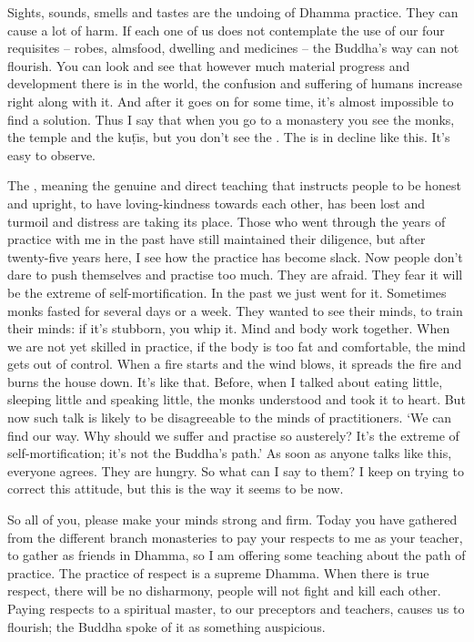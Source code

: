 Sights, sounds, smells and tastes are the undoing of Dhamma practice. They can cause a lot of harm. If each one of us does not contemplate the use of our four requisites -- robes, almsfood, dwelling and medicines -- the Buddha's way can not flourish. You can look and see that however much material progress and development there is in the world, the confusion and suffering of humans increase right along with it. And after it goes on for some time, it's almost impossible to find a solution. Thus I say that when you go to a monastery you see the monks, the temple and the ku\d{t}\={\i}s, but you don't see the . The  is in decline like this. It's easy to observe. 

The , meaning the genuine and direct teaching that instructs people to be honest and upright, to have loving-kindness towards each other, has been lost and turmoil and distress are taking its place. Those who went through the years of practice with me in the past have still maintained their diligence, but after twenty-five years here, I see how the practice has become slack. Now people don't dare to push themselves and practise too much. They are afraid. They fear it will be the extreme of self-mortification. In the past we just went for it. Sometimes monks fasted for several days or a week. They wanted to see their minds, to train their minds: if it's stubborn, you whip it. Mind and body work together. When we are not yet skilled in practice, if the body is too fat and comfortable, the mind gets out of control. When a fire starts and the wind blows, it spreads the fire and burns the house down. It's like that. Before, when I talked about eating little, sleeping little and speaking little, the monks understood and took it to heart. But now such talk is likely to be disagreeable to the minds of practitioners. `We can find our way. Why should we suffer and practise so austerely? It's the extreme of self-mortification; it's not the Buddha's path.' As soon as anyone talks like this, everyone agrees. They are hungry. So what can I say to them? I keep on trying to correct this attitude, but this is the way it seems to be now. 

So all of you, please make your minds strong and firm. Today you have gathered from the different branch monasteries to pay your respects to me as your teacher, to gather as friends in Dhamma, so I am offering some teaching about the path of practice. The practice of respect is a supreme Dhamma. When there is true respect, there will be no disharmony, people will not fight and kill each other. Paying respects to a spiritual master, to our preceptors and teachers, causes us to flourish; the Buddha spoke of it as something auspicious. 

